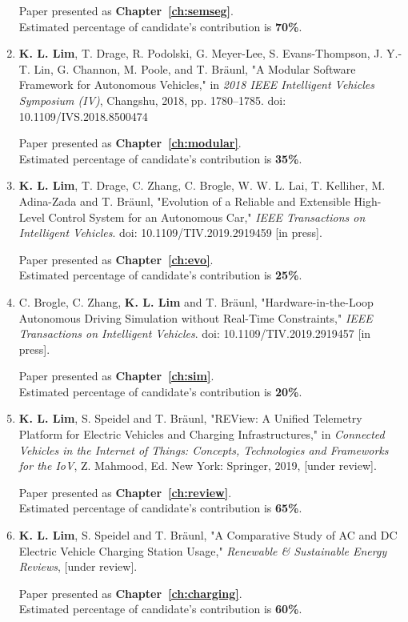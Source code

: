 \begin{enumerate}
	Paper presented as \textbf{Chapter~\ref{ch:semseg}}. \\
	Estimated percentage of candidate's contribution is \textbf{70\%}.
	
	\item \textbf{K. L. Lim}, T. Drage, R. Podolski, G. Meyer-Lee, S. Evans-Thompson, J. Y.-T. Lin, G. Channon, M. Poole, and T. Bräunl, "A Modular Software Framework for Autonomous Vehicles," in \textit{2018 IEEE Intelligent Vehicles Symposium (IV)}, Changshu, 2018, pp. 1780--1785. doi: 10.1109/IVS.2018.8500474
	
	Paper presented as \textbf{Chapter~\ref{ch:modular}}. \\
	Estimated percentage of candidate's contribution is \textbf{35\%}.
	
	\item \textbf{K. L. Lim}, T. Drage, C. Zhang, C. Brogle, W. W. L. Lai, T. Kelliher, M. Adina-Zada and T. Bräunl, "Evolution of a Reliable and Extensible High-Level Control System for an Autonomous Car," \textit{IEEE Transactions on Intelligent Vehicles}. doi: 10.1109/TIV.2019.2919459 [in press].
	
	Paper presented as \textbf{Chapter~\ref{ch:evo}}. \\
	Estimated percentage of candidate's contribution is \textbf{25\%}.
	
	\item C. Brogle, C. Zhang, \textbf{K. L. Lim} and T. Bräunl, "Hardware-in-the-Loop Autonomous Driving Simulation without Real-Time Constraints," \textit{IEEE Transactions on Intelligent Vehicles}. doi: 10.1109/TIV.2019.2919457 [in press].
	
	Paper presented as \textbf{Chapter~\ref{ch:sim}}. \\
	Estimated percentage of candidate's contribution is \textbf{20\%}.
	
	\item \textbf{K. L. Lim}, S. Speidel and T. Bräunl, "REView: A Unified Telemetry Platform for Electric Vehicles and Charging Infrastructures," in \textit{Connected Vehicles in the Internet of Things: Concepts, Technologies and Frameworks for the IoV}, Z. Mahmood, Ed. New York: Springer, 2019, [under review].
	
	Paper presented as \textbf{Chapter~\ref{ch:review}}. \\
	Estimated percentage of candidate's contribution is \textbf{65\%}.
	
	\item \textbf{K. L. Lim}, S. Speidel and T. Bräunl, "A Comparative Study of AC and DC Electric Vehicle Charging Station Usage," \textit{Renewable \& Sustainable Energy Reviews}, [under review].
	
	Paper presented as \textbf{Chapter~\ref{ch:charging}}. \\
	Estimated percentage of candidate's contribution is \textbf{60\%}.
\end{enumerate}


